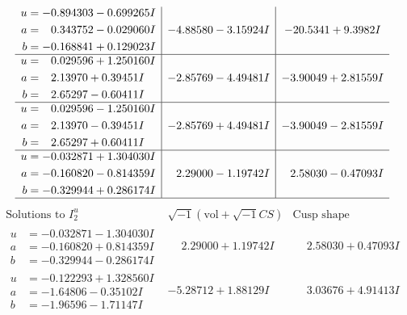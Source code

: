 \documentclass[1p]{elsarticle_modified}
\theoremstyle{definition}
\newcommand{\I}{\sqrt{-1}}
\begin{document}
$$\begin{array}{c|c|c}
\begin{aligned}
u &= -0.894303 - 0.699265 I \\
a &= \phantom{-}0.343752 - 0.029060 I \\
b &= -0.168841 + 0.129023 I\end{aligned}
 & -4.88580 - 3.15924 I & -20.5341 + 9.3982 I \\ \hline\begin{aligned}
u &= \phantom{-}0.029596 + 1.250160 I \\
a &= \phantom{-}2.13970 + 0.39451 I \\
b &= \phantom{-}2.65297 - 0.60411 I\end{aligned}
 & -2.85769 - 4.49481 I & -3.90049 + 2.81559 I \\ \hline\begin{aligned}
u &= \phantom{-}0.029596 - 1.250160 I \\
a &= \phantom{-}2.13970 - 0.39451 I \\
b &= \phantom{-}2.65297 + 0.60411 I\end{aligned}
 & -2.85769 + 4.49481 I & -3.90049 - 2.81559 I \\ \hline\begin{aligned}
u &= -0.032871 + 1.304030 I \\
a &= -0.160820 - 0.814359 I \\
b &= -0.329944 + 0.286174 I\end{aligned}
 & \phantom{-}2.29000 - 1.19742 I & \phantom{-}2.58030 - 0.47093 I\\
 \hline 
 \end{array}$$\newpage$$\begin{array}{c|c|c}  
\text{Solutions to }I^u_{2}& \I (\text{vol} + \sqrt{-1}CS) & \text{Cusp shape}\\
 \hline 
\begin{aligned}
u &= -0.032871 - 1.304030 I \\
a &= -0.160820 + 0.814359 I \\
b &= -0.329944 - 0.286174 I\end{aligned}
 & \phantom{-}2.29000 + 1.19742 I & \phantom{-}2.58030 + 0.47093 I \\ \hline\begin{aligned}
u &= -0.122293 + 1.328560 I \\
a &= -1.64806 - 0.35102 I \\
b &= -1.96596 - 1.71147 I\end{aligned}
 & -5.28712 + 1.88129 I & \phantom{-}3.03676 + 4.91413 I \\ \hline\begin{aligned}

\end{aligned}
\end{array}$$
\end{document}
